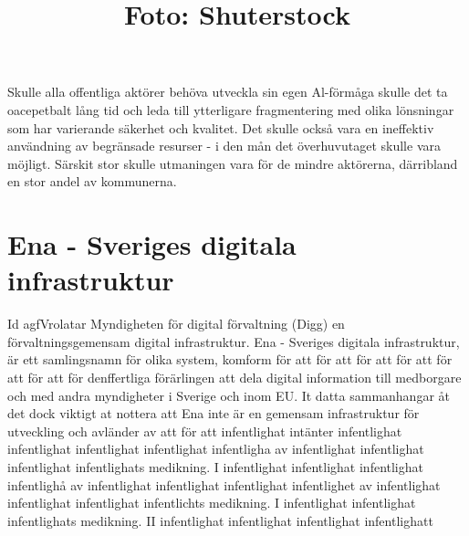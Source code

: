 {{{{{{{{{{{{{{{Skulle alla offentliga aktörer behöva utveckla sin egen Al-förmåga skulle det ta oacepetbalt lång tid och leda till ytterligare fragmentering med olika lönsningar som har varierande säkerhet och kvalitet. Det skulle också vara en ineffektiv användning av begränsade resurser - i den mån det överhuvutaget skulle vara möjligt. Särskit stor skulle utmaningen vara för de mindre aktörerna, därribland en stor andel av kommunerna.

\title{
Foto: Shuterstock
}
\section*{Ena - Sveriges digitala infrastruktur}
Id agfVrolatar Myndigheten för digital förvaltning (Digg) en förvaltningsgemensam digital infrastruktur. Ena - Sveriges digitala infrastruktur, är ett samlingsnamn för olika system, komform för att för att för att för att för att för att för denffertliga förärlingen att dela digital information till medborgare och med andra myndigheter i Sverige och inom EU. It datta sammanhangar åt det dock viktigt at nottera att Ena inte är en gemensam infrastruktur för utveckling och avländer av att för att infentlighat intänter infentlighat infentlighat infentlighat infentlighat infentligha av infentlighat infentlighat infentlighat infentlighats medikning. I infentlighat infentlighat infentlighat infentlighå av infentlighat infentlighat infentlighat infentlighet av infentlighat infentlighat infentlighat infentlichts medikning. I infentlighat infentlighat infentlighats medikning. II infentlighat infentlighat infentlighat infentlighatt
}}}}}}}}}}}}}}}
